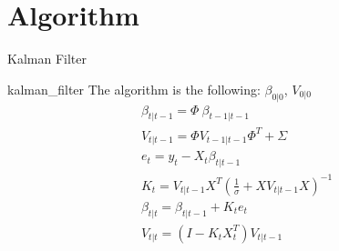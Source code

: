 \documentclass{article}
\theoremstyle{plain}
\theoremstyle{definition}
\theoremstyle{remark}
\begin{document}
\appendix
\section{Algorithm}

\begin{algorithm}                      %
\caption{Kalman Filter}          %
\label{alg1}                           %
\begin{algorithmic}[1]
\PROCEDURE kalman\_filter                  %
The algorithm is the following:
\REQUIRE $\beta_{0|0}$, $V_{0|0}$
\begin{eqnarray*}
\beta_{t|t-1} = \Phi \: \beta_{t-1|t-1}\\
V_{t|t-1} = \Phi  V_{t-1|t-1} \Phi ^T + \Sigma\\
e_t = y_t -  X_t \beta_{t|t-1} \\
K_t =  V_{t|t-1} X^T (\frac1\sigma + X V_{t|t-1} X )^{-1}\\
\beta_{t|t} = \beta_{t|t-1} + K_t e_t\\
V_{t|t} = (I - K_t X_t^T) V_{t|t-1}\\
\end{eqnarray*}
\end{algorithmic}
\end{algorithm}
\end{document}
